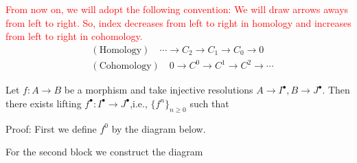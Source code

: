 \begin{itemize}
    \begin{notation}
        \textcolor{red}{From now on, we will adopt the following convention: We will draw arrows aways from left to right. So, index decreases 
        from left to right in homology and increases from left to right in cohomology.}
        \begin{equation}
            \begin{split}
                &(\text{Homology})\quad\cdots\to C_2\to C_1\to C_0\to 0\\
                &(\text{Cohomology})\quad 0\to C^0\to C^1\to C^2\to \cdots
            \end{split}
        \end{equation}
    \end{notation}
    
    \begin{lemma}
        Let $f:A\to B$ be a morphism and take injective resolutions 
        $A\to I^\bullet, B\to J^\bullet$. Then there exists 
        lifting $f^\bullet:I^\bullet\to J^\bullet$,i.e., $\{f^n\}_{n\geq0}$ such that 
        \begin{center}
        \end{center}
    \end{lemma}
    Proof: First we define $f^0$ by the diagram below.
    \begin{center}
    \end{center}
    For the second block we construct the diagram 
    \begin{center}
\end{center}
\end{itemize}
